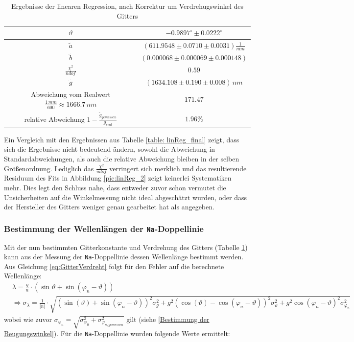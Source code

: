 \documentclass[a4paper, 11pt]{article}
\begin{document}
\begin{table}[H]
	\renewcommand{\arraystretch}{1.5}
	\large
	\centering
	\begin{tabular}{|c|c|}
		\hline
		$\vartheta$		&	$ -0.9897^\circ \pm 0.0222^\circ $	\\
		\hline
		$\tilde{a}$ &	$(611.9548 \pm 0.0710 \pm 0.0031) \frac{1}{mm}$ \\
		\hline
		$\tilde{b}$	&	$(0.000068 \pm 0.000069 \pm 0.000148) $ \\
		\hline
		$\frac{\chi^2}{ndof}$	&	$0.59$	\\
		\hline
		$\tilde{g}$	&	$(1634.108 \pm 0.190 \pm 0.008)\, nm$ \\
		\hline
		Abweichung vom Realwert $\frac{1 \,mm}{600} \approx	1666.7\, nm$	&	$ 171.47 $ \\
		\hline
		relative Abweichung $1 - \frac{\tilde{g}_{gemessen}}{g_{real}}$ &	$ 1.96 \%$ \\
		\hline
	\end{tabular}
	\caption{Ergebnisse der linearen Regression, nach Korrektur um Verdrehugswinkel des Gitters}
	\label{table: linReg_2_final}
\end{table}
Ein Vergleich mit den Ergebnissen aus Tabelle \ref{table: linReg_final} zeigt, dass sich die Ergebnisse nicht bedeutend ändern, sowohl die Abweichung in Standardabweichungen, als auch die relative Abweichung bleiben in der selben Größenordnung. Lediglich das $\frac{\chi^2}{ndof}$ verringert sich merklich und das resultierende Residuum des Fits in Abbildung \ref{pic:linReg_2} zeigt keinerlei Systematiken mehr.
Dies legt den Schluss nahe, dass entweder zuvor schon vermutet die Unsicherheiten auf die Winkelmessung nicht ideal abgeschätzt wurden, oder dass der Hersteller des Gitters weniger genau gearbeitet hat als angegeben.

\subsubsection{Bestimmung der Wellenlängen der \texttt{Na}-Doppellinie}
Mit der nun bestimmten Gitterkonstante und Verdrehung des Gitters (Tabelle \ref{table: linReg_2_final}) kann aus der Messung der \texttt{Na}-Doppellinie dessen Wellenlänge bestimmt werden. Aus Gleichung \ref{eq:GitterVerdreht} folgt für den Fehler auf die berechnete Wellenlänge:
\begin{eqnarray*}\label{eq:LambdaFehler}
& \lambda = \frac{g}{n} \cdot ( \sin{\vartheta} + \sin(\varphi_n - \vartheta) )
\\
& \Rightarrow \sigma_\lambda = \frac{1}{|n|} \cdot \sqrt{ \left(\sin(\vartheta)+\sin(\varphi_n-\vartheta)\right)^2 \sigma_g^2 + g^2\left(\cos(\vartheta)-\cos(\varphi_n-\vartheta)\right)^2 \sigma_\vartheta^2 + g^2 \cos(\varphi_n-\vartheta)^2 \sigma_{\varphi_n}^2     }
\end{eqnarray*}
wobei wie zuvor $\sigma_{\varphi_n} = \sqrt{\sigma_{\varphi_0}^2+\sigma_{\varphi_{n,gemessen}}^2}$ gilt (siehe \ref{Bestimmung der Beugungswinkel}).
Für die \texttt{Na}-Doppellinie wurden folgende Werte ermittelt:
\end{document}
